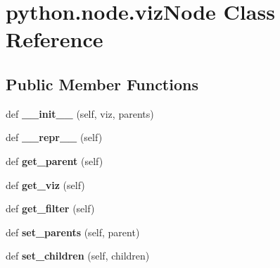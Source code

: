 \hypertarget{classpython_1_1node_1_1viz_node}{}\section{python.\+node.\+viz\+Node Class Reference}
\label{classpython_1_1node_1_1viz_node}
\subsection*{Public Member Functions}
\begin{DoxyCompactItemize}
\item 
\mbox{\label{classpython_1_1node_1_1viz_node_af68a2bcd66c7863e5b1216182f3d0986}} 
def {\bfseries \+\_\+\+\_\+init\+\_\+\+\_\+} (self, viz, parents)
\item 
\mbox{\label{classpython_1_1node_1_1viz_node_a6286f56b779c28a84f7f0e60f643b4b4}} 
def {\bfseries \+\_\+\+\_\+repr\+\_\+\+\_\+} (self)
\item 
\mbox{\label{classpython_1_1node_1_1viz_node_a568aa5f0e89293ebb88d5b876410b4fe}} 
def {\bfseries get\+\_\+parent} (self)
\item 
\mbox{\label{classpython_1_1node_1_1viz_node_aa33db799e5818d8c84a7b42e77a356cb}} 
def {\bfseries get\+\_\+viz} (self)
\item 
\mbox{\label{classpython_1_1node_1_1viz_node_a8ed08977128092a15493885e59233943}} 
def {\bfseries get\+\_\+filter} (self)
\item 
\mbox{\label{classpython_1_1node_1_1viz_node_a8ad413234294485ce32c301a4df02505}} 
def {\bfseries set\+\_\+parents} (self, parent)
\item 
\mbox{\label{classpython_1_1node_1_1viz_node_acb058462c60545ddea5461f4f3a13e6b}} 
def {\bfseries set\+\_\+children} (self, children)
\item 
\mbox{\label{classpython_1_1node_1_1viz_node_a9b6306722dea56308c4da03e480387b2}} 

\end{DoxyCompactItemize}
